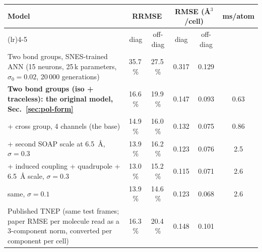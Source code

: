 \documentclass[11pt,a4paper]{article}
\begin{document}
\begin{center}\footnotesize\setlength{\tabcolsep}{4pt}
\begin{tabular}{@{}>{\raggedright\arraybackslash}p{5.0cm}ccccc@{}}
\toprule
Model & \multicolumn{2}{c}{RRMSE} & \multicolumn{2}{c}{RMSE (\AA{}$^3$/cell)} & ms/atom \\
\cmidrule(lr){2-3}\cmidrule(lr){4-5}
 & diag & off-diag & diag & off-diag & \\
\midrule
Two bond groups, SNES-trained ANN (15 neurons, 25\,k parameters, $\sigma_0=0.02$, 20\,000 generations) & 35.7\,\% & 27.5\,\% & 0.317 & 0.129 & \\
\textbf{Two bond groups (iso + traceless): the original model, Sec.~\ref{sec:pol-form}} & 16.6\,\% & 19.9\,\% & 0.147 & 0.093 & 0.63 \\
+ cross group, 4 channels (the base) & 14.9\,\% & 16.0\,\% & 0.132 & 0.075 & 0.86 \\
+ second SOAP scale at 6.5~\AA{}, $\sigma=0.3$ & 13.9\,\% & 16.2\,\% & 0.123 & 0.076 & 2.5 \\
+ induced coupling + quadrupole + 6.5~\AA{} scale, $\sigma=0.3$ & 13.0\,\% & 15.2\,\% & 0.115 & 0.071 & 2.6 \\
\quad same, $\sigma=0.1$ & 13.9\,\% & 14.6\,\% & 0.123 & 0.068 & 2.6 \\
Published TNEP (same test frames; paper RMSE per molecule read as a 3-component norm, converted per component per cell) & 16.3\,\% & 20.4\,\% & 0.148 & 0.101 & \\
\bottomrule
\end{tabular}
\end{center}
\end{document}
